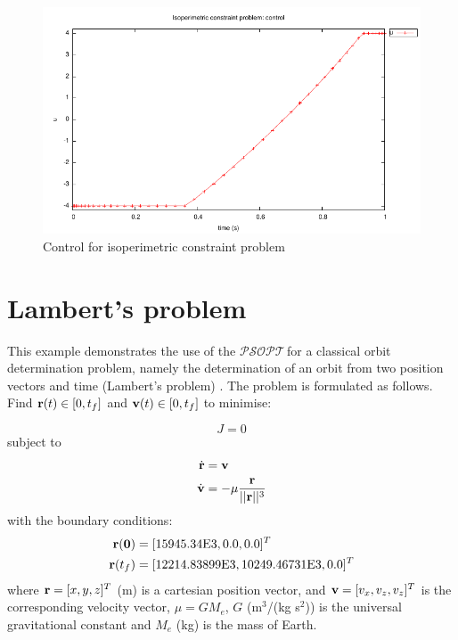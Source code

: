 \documentclass[a4paper,11pt]{report}    %
\newcommand{\psopt}{$\mathcal{PSOPT}$\,}  %
\newcommand{\mt}[1]{\ensuremath \mathbf{#1}}
\begin{document}
\begin{figure}
  \centering
  \includegraphics{../examples/isop/isop_control}
  \caption{Control for isoperimetric constraint problem}
 \label{isop_control}
\end{figure}



\section{Lambert's problem}

This example demonstrates the use of the \psopt for a classical orbit
determination problem, namely the determination of an orbit from two position vectors and
time (Lambert's problem) \cite{Vallado:01}. The problem is formulated as follows. Find $\mt{r}(t) \in [0,t_f]$ and $\mt{v}(t) \in [0,t_f]$ to minimise:

\begin{equation}
  J =  0
\end{equation}
subject to
\begin{equation}
  \begin{aligned}
     \dot{ \mt{r} }&= \mt{v} \\
     \dot{ \mt{v} }&= -\mu \frac{  \mt{r}    }{ || \mt{r} ||^3 }
  \end{aligned}
\end{equation}
with the boundary conditions:
\begin{equation}
\begin{aligned}
 \mt{r(0)} &= [15945.34\mathrm{E}3, 0.0, 0.0]^T \\
 \mt{r}(t_f) &= [ 12214.83899\mathrm{E}3, 10249.46731\mathrm{E}3, 0.0 ]^T
\end{aligned}
\end{equation}
where $\mt{r}=[x, y, z]^T$ (m) is a cartesian position vector, and $\mt{v}=[v_x, v_z, v_z]^T$ is the corresponding
velocity vector, $\mu=G M_e$, $G$ (m$^3$/(kg s$^2$)) is the universal gravitational constant and $M_e$ (kg) is the mass of Earth.
\end{document}
